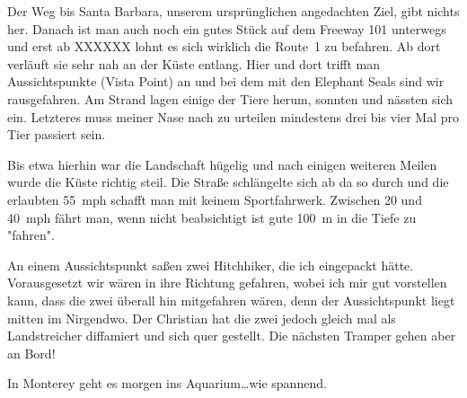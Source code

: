 Der Weg bis Santa Barbara, unserem ursprünglichen angedachten Ziel, gibt nichts her.
Danach ist man auch noch ein gutes Stück auf dem Freeway 101 unterwegs und erst ab XXXXXX lohnt es sich wirklich die Route~1 zu befahren.
Ab dort verläuft sie sehr nah an der Küste entlang.
Hier und dort trifft man Aussichtspunkte (Vista Point) an und bei dem mit den Elephant Seals sind wir rausgefahren.
Am Strand lagen einige der Tiere herum, sonnten und nässten sich ein.
Letzteres muss meiner Nase nach zu urteilen mindestens drei bis vier Mal pro Tier passiert sein.

Bis etwa hierhin war die Landschaft hügelig und nach einigen weiteren Meilen wurde die Küste richtig steil.
Die Straße schlängelte sich ab da so durch und die erlaubten 55~mph schafft man mit keinem Sportfahrwerk.
Zwischen 20 und 40~mph fährt man, wenn nicht beabsichtigt ist gute 100~m in die Tiefe zu "fahren".

An einem Aussichtspunkt saßen zwei Hitchhiker, die ich eingepackt hätte.
Vorausgesetzt wir wären in ihre Richtung gefahren, wobei ich mir gut vorstellen kann, dass die zwei überall hin mitgefahren wären, denn der Aussichtspunkt liegt mitten im Nirgendwo.
Der Christian hat die zwei jedoch gleich mal als Landstreicher diffamiert und sich quer gestellt.
Die nächsten Tramper gehen aber an Bord!

In Monterey geht es morgen ins Aquarium\dots wie spannend.
